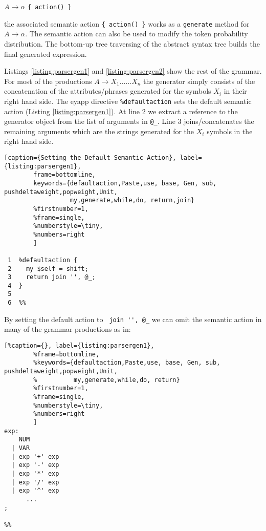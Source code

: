 \begin{center}
$A \rightarrow \alpha$ \verb|{ action() }|
\end{center}

\noindent the associated semantic action \verb|{ action() }|
works as a \verb|generate| method for $A \rightarrow \alpha$.
The semantic action can also be used to modify
the token probability distribution.
The bottom-up tree traversing of the abstract syntax tree
builds the final generated expression. 

Listings 
\ref{listing:parsergen1}
and
\ref{listing:parsergen2}
show the rest of the grammar. 
For most of the productions $A \rightarrow X_1 ... \ldots X_n$
the generator simply consists of the concatenation
of the attributes/phrases generated for the symbols $X_i$ in
their right hand side. The eyapp directive \verb|%defaultaction| 
sets the default semantic action (Listing \ref{listing:parsergen1}). 
At line 2 we extract a reference to the generator
object from the list of arguments in \verb|@_|. Line 3 
joins/concatenates the remaining arguments which are the
strings generated for the  $X_i$ symbols in the right hand side.

\begin{lstlisting}[caption={Setting the Default Semantic Action}, label={listing:parsergen1}, 
        frame=bottomline,
        keywords={defaultaction,Paste,use, base, Gen, sub, pushdeltaweight,popweight,Unit,
                  my,generate,while,do, return,join}
        %firstnumber=1, 
        %frame=single,
        %numberstyle=\tiny,
        %numbers=right
        ]

 1	%defaultaction {
 2	  my $self = shift;
 3	  return join '', @_;
 4	}
 5	
 6	%%
\end{lstlisting}

By setting the default action to \verb| join '', @_|
we can omit the semantic action in many of the grammar productions
as in:

\begin{lstlisting}[%caption={}, label={listing:parsergen1}, 
        %frame=bottomline,
        %keywords={defaultaction,Paste,use, base, Gen, sub, pushdeltaweight,popweight,Unit,
        %          my,generate,while,do, return}
        %firstnumber=1, 
        %frame=single,
        %numberstyle=\tiny,
        %numbers=right
        ]
exp:
    NUM                
  | VAR
  | exp '+' exp        
  | exp '-' exp        
  | exp '*' exp        
  | exp '/' exp        
  | exp '^' exp        
      ...
;

%%
\end{lstlisting}

